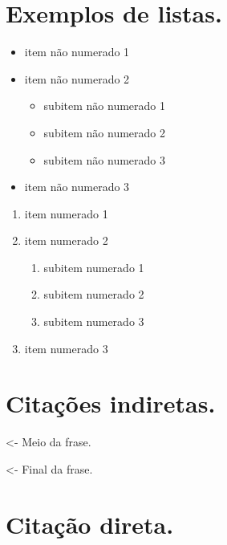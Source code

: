 
\section{Exemplos de listas.}

\begin{itemize}
    \item item não numerado 1
    \item item não numerado 2
    \begin{itemize}
        \item subitem não numerado 1
        \item subitem não numerado 2
        \item subitem não numerado 3
    \end{itemize}
    \item item não numerado 3
\end{itemize}
\vspace{5mm}
\begin{enumerate}
    \item item numerado 1
    \item item numerado 2
    \begin{enumerate}
        \item subitem numerado 1
        \item subitem numerado 2
        \item subitem numerado 3
    \end{enumerate}
    \item item numerado 3
\end{enumerate}



\section{Citações indiretas.}

  <- Meio da frase.

\cite{Maturana2003} <- Final da frase.


\section{Citação direta.}


